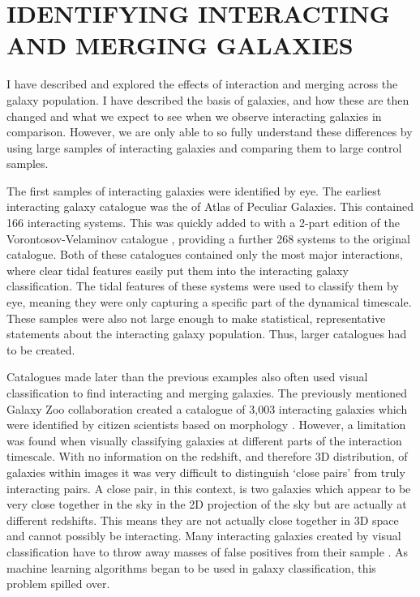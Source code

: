 \section{IDENTIFYING INTERACTING AND MERGING GALAXIES}
\noindent I have described and explored the effects of interaction and merging across the galaxy population. I have described the basis of galaxies, and how these are then changed and what we expect to see when we observe interacting galaxies in comparison. However, we are only able to so fully understand these differences by using large samples of interacting galaxies and comparing them to large control samples.

The first samples of interacting galaxies were identified by eye. The earliest interacting galaxy catalogue was the \citet{1966ApJS...14....1A} of Atlas of Peculiar Galaxies. This contained 166 interacting systems. This was quickly added to with a 2-part edition of the Vorontosov-Velaminov catalogue \citep{1977A&AS...28....1V}, providing a further 268 systems to the original \citet{1966ApJS...14....1A} catalogue. Both of these catalogues contained only the most major interactions, where clear tidal features easily put them into the interacting galaxy classification. The tidal features of these systems were used to classify them by eye, meaning they were only capturing a specific part of the dynamical timescale. These samples were also not large enough to make statistical, representative statements about the interacting galaxy population. Thus, larger catalogues had to be created.

Catalogues made later than the previous examples also often used visual classification to find interacting and merging galaxies. The previously mentioned Galaxy Zoo collaboration created a catalogue of 3,003 interacting galaxies which were identified by citizen scientists based on morphology \citep{2010MNRAS.401.1043D}. However, a limitation was found when visually classifying galaxies at different parts of the interaction timescale. With no information on the redshift, and therefore 3D distribution, of galaxies within images it was very difficult to distinguish `close pairs' from truly interacting pairs. A close pair, in this context, is two galaxies which appear to be very close together in the sky in the 2D projection of the sky but are actually at different redshifts. This means they are not actually close together in 3D space and cannot possibly be interacting. Many interacting galaxies created by visual classification have to throw away masses of false positives from their sample \citep{2020MNRAS.492.2075B, 2022A&A...661A..52P}. As machine learning algorithms began to be used in galaxy classification, this problem spilled over.

